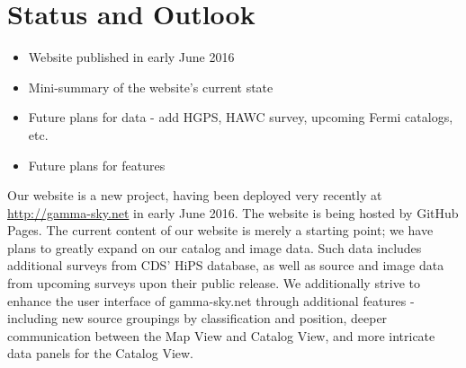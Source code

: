 \section{Status and Outlook}

\begin{itemize}

  \item Website published in early June 2016
  \item Mini-summary of the website's current state
  \item Future plans for data - add HGPS, HAWC survey, upcoming Fermi catalogs, etc.
  \item Future plans for features

\end{itemize}


Our website is a new project, having been deployed very recently at \url{http://gamma-sky.net} in early June 2016. The website is being hosted by GitHub Pages. The current content of our website is merely a starting point; we have plans to greatly expand on our catalog and image data. Such data includes additional surveys from CDS' HiPS database, as well as source and image data from upcoming surveys upon their public release. We additionally strive to enhance the user interface of gamma-sky.net through additional features - including new source groupings by classification and position, deeper communication between the Map View and Catalog View, and more intricate data panels for the Catalog View.

